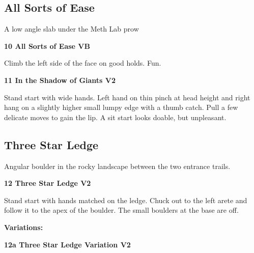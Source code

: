 \begin{multicols}{2}
			\subsection*{All Sorts of Ease}\label{bf:All Sorts of Ease}
			\begin{minipage}{\columnwidth}
			A low angle slab under the Meth Lab prow
			\end{minipage}
			

					\begin{minipage}{\linewidth}	
					\label{rt:All Sorts of Ease}
\colorbox{green!20}{
\textbf{
10 All Sorts of Ease VB    
}
}

					\begin{adjustwidth}{0.5cm}{}				
					Climb the left side of the face on good holds. Fun.
					\end{adjustwidth}
					\end{minipage}
					\begin{minipage}{\linewidth}	
					\label{rt:In the Shadow of Giants}
\colorbox{green!20}{
\textbf{
11 In the Shadow of Giants V2   
}
}

					\begin{adjustwidth}{0.5cm}{}				
					Stand start with wide hands. Left hand on thin pinch at head height and right hang on a slightly higher small lumpy edge with a thumb catch. Pull a few delicate moves to gain the lip. A sit start looks doable, but unpleasant.
					\end{adjustwidth}
					\end{minipage}
			\subsection*{Three Star Ledge}\label{bf:Three Star Ledge}
			\begin{minipage}{\columnwidth}
			Angular boulder in the rocky landscape between the two entrance trails.
			\end{minipage}
			

					\begin{minipage}{\linewidth}	
					\label{rt:Three Star Ledge}
\colorbox{green!20}{
\textbf{
12 Three Star Ledge V2    
}
}

					\begin{adjustwidth}{0.5cm}{}				
					Stand start with hands matched on the ledge. Chuck out to the left arete and follow it to the apex of the boulder. The small boulders at the base are off.
					\end{adjustwidth}
					\end{minipage}
						\begin{adjustwidth}{0.5cm}{}				
						\textbf{Variations:} \newline
							\begin{minipage}{\linewidth}	
							\label{vr:Three Star Ledge Variation}
\colorbox{green!20}{
\textbf{
12a Three Star Ledge Variation V2    
}
}


\end{minipage}
\end{adjustwidth}
\end{multicols}

